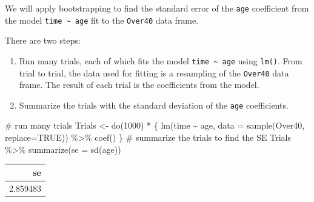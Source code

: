 \documentclass[
  letterpaper,
  DIV=11,
  numbers=noendperiod,
  oneside]{scrreprt}
\newenvironment{Shaded}{\begin{snugshade}}{\end{snugshade}}
\newcommand{\AttributeTok}[1]{\textcolor[rgb]{0.40,0.45,0.13}{#1}}
\newcommand{\CommentTok}[1]{\textcolor[rgb]{0.37,0.37,0.37}{#1}}
\newcommand{\ConstantTok}[1]{\textcolor[rgb]{0.56,0.35,0.01}{#1}}
\newcommand{\DecValTok}[1]{\textcolor[rgb]{0.68,0.00,0.00}{#1}}
\newcommand{\FunctionTok}[1]{\textcolor[rgb]{0.28,0.35,0.67}{#1}}
\newcommand{\NormalTok}[1]{\textcolor[rgb]{0.00,0.23,0.31}{#1}}
\newcommand{\OtherTok}[1]{\textcolor[rgb]{0.00,0.23,0.31}{#1}}
\newcommand{\SpecialCharTok}[1]{\textcolor[rgb]{0.37,0.37,0.37}{#1}}
\begin{document}
\begin{tcolorbox}[enhanced jigsaw, colbacktitle=quarto-callout-warning-color!10!white, breakable, opacitybacktitle=0.6, colback=white, left=2mm, arc=.35mm, colframe=quarto-callout-warning-color-frame, coltitle=black, toprule=.15mm, opacityback=0, leftrule=.75mm, bottomtitle=1mm, toptitle=1mm, titlerule=0mm, title=\textcolor{quarto-callout-warning-color}{\faExclamationTriangle}\hspace{0.5em}{Demonstration: Bootstrapping the standard error}, rightrule=.15mm, bottomrule=.15mm]

We will apply bootstrapping to find the standard error of the
\texttt{age} coefficient from the model
\texttt{time\ \textasciitilde{}\ age} fit to the \texttt{Over40} data
frame.

There are two steps:

\begin{enumerate}
\def\labelenumi{\arabic{enumi}.}
\item
  Run many trials, each of which fits the model
  \texttt{time\ \textasciitilde{}\ age} using \texttt{lm()}. From trial
  to trial, the data used for fitting is a resampling of the
  \texttt{Over40} data frame. The result of each trial is the
  coefficients from the model.
\item
  Summarize the trials with the standard deviation of the \texttt{age}
  coefficients.
\end{enumerate}

\begin{Shaded}
\begin{Highlighting}[]
\CommentTok{\# run many trials}
\NormalTok{Trials }\OtherTok{\textless{}{-}} \FunctionTok{do}\NormalTok{(}\DecValTok{1000}\NormalTok{) }\SpecialCharTok{*}\NormalTok{ \{}
  \FunctionTok{lm}\NormalTok{(time }\SpecialCharTok{\textasciitilde{}}\NormalTok{ age, }\AttributeTok{data =} \FunctionTok{sample}\NormalTok{(Over40, }\AttributeTok{replace=}\ConstantTok{TRUE}\NormalTok{)) }\SpecialCharTok{\%\textgreater{}\%} 
       \FunctionTok{coef}\NormalTok{()}
\NormalTok{\}}
\CommentTok{\# summarize the trials to find the SE}
\NormalTok{Trials }\SpecialCharTok{\%\textgreater{}\%} \FunctionTok{summarize}\NormalTok{(}\AttributeTok{se =} \FunctionTok{sd}\NormalTok{(age))}
\end{Highlighting}
\end{Shaded}

\ttfamily 
\begin{tabular}{r}
\toprule
se\\
\midrule
2.859483\\
\bottomrule
\end{tabular} \normalfont
\bigskip

\end{tcolorbox}
\end{document}
